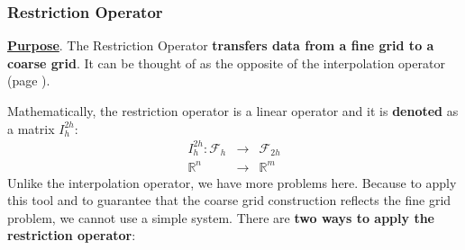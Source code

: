 \subsubsection{Restriction Operator}\label{subsubsection: Restriction Operator}

\textbf{\underline{Purpose}}. The Restriction Operator \textbf{transfers data from a fine grid to a coarse grid}. It can be thought of as the opposite of the interpolation operator (page \pageref{subsubsection: Interpolation Operator}).

\highspace
Mathematically, the restriction operator is a linear operator and it is \textbf{denoted} as a matrix $I_{h}^{2h}$:
\begin{equation}
	\begin{array}{rcl}
		I^{2h}_{h}: \mathcal{F}_{h} & \longrightarrow & \mathcal{F}_{2h} \\ [.5em]
		\mathbb{R}^{n} & \longrightarrow & \mathbb{R}^{m}
	\end{array}
\end{equation}
Unlike the interpolation operator, we have more problems here. Because to apply this tool and to guarantee that the coarse grid construction reflects the fine grid problem, we cannot use a simple system. There are \textbf{two ways to apply the restriction operator}:

